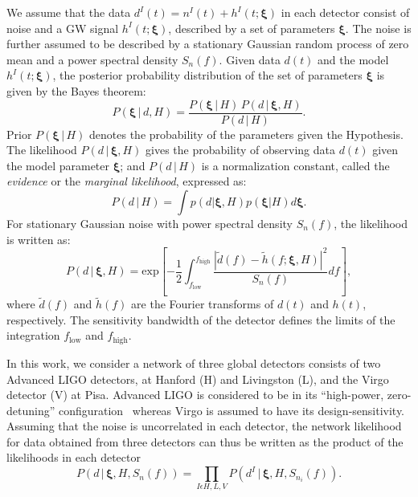 \documentclass[prd,preprintnumbers,twocolumn,eqsecnum,floatfix,a4paper,nofootinbib,superscriptaddress]{revtex4}
\newcommand{\bxi}{\bm{\xi}}
\begin{document}
We assume that the data $d^I(t) = n^I(t) + h^I(t;\bxi)$ in each detector consist of noise and a GW signal $h^I(t; \bxi)$, described by a set of parameters $\bxi$. The noise is further assumed to be described by a stationary Gaussian random process of zero mean and a power spectral density $S_n(f)$. Given data $d(t)$ and the model $h^I(t; \bxi)$, the posterior probability distribution of the set of parameters ${\bxi}$ is given by the Bayes theorem: 
\begin{equation}
P({\bxi} \, | \, d, H) = \frac{P({\bxi} \, | \, H) \, P (d \, | \, {\bxi}, H)}{P(d \, | \, H)}.
\label{eq:Bayes_theorem}
\end{equation} 
Prior $P({\bxi} \, | \, H)$ denotes the probability of the parameters given the Hypothesis.  The likelihood $P (d \, | \, {\bxi}, H)$ gives the probability of observing data $d(t)$ given the model parameter $\bxi$; and $P(d \, | \, H)$ is a normalization constant, called the \emph{evidence} or the \emph{marginal likelihood}, expressed as:
 \begin{equation}
 P(d \, | \, H)=\int p(d|\bxi, H)p(\bxi | H)d\bxi.
 \label{eq:evidence}
 \end{equation}
For stationary Gaussian noise with power spectral density $S_n(f)$, the likelihood is written as:
\begin{equation}
P (d \, | \, {\bxi}, H) = \text{exp}\left[ -\frac{1}{2}\int_{f_\mathrm{low}}^{f_\mathrm{high}} \frac{|\tilde{d}(f) - \tilde{h}(f;{\bxi}, H)|^2}{S_n(f)}df\right],
\end{equation}
where $\tilde{d}(f)$ and $\tilde{h}(f)$ are the Fourier transforms of $d(t)$ and $h(t)$, respectively. The sensitivity bandwidth of the detector defines the limits of the integration $f_\mathrm{low}$ and $f_\mathrm{high}$. 

In this work, we consider a network of three global detectors consists of two Advanced LIGO detectors, at Hanford (H) and Livingston (L), and the Virgo detector (V) at Pisa. Advanced LIGO is considered to be in its ``high-power, zero-detuning'' configuration~\cite{aLIGOZeroDetHighPower} whereas Virgo is assumed to have its design-sensitivity. Assuming that the noise is uncorrelated in each detector, the network likelihood for data obtained from three detectors can thus be written as the product of the likelihoods in each detector
\begin{equation}
P (d \, | \, {\bxi}, H, S_n(f)) = \prod_{I \epsilon {H,L,V}} P (d^{I} \, | \, {\bxi}, H, S_{n_{i}}(f)).
\end{equation}
\end{document}
